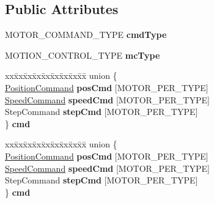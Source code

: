 \subsection*{Public Attributes}
\begin{DoxyCompactItemize}
\item 
\mbox{\label{structRobotCommand_a23247dced08b76adbead322cdd509bfa}} 
M\+O\+T\+O\+R\+\_\+\+C\+O\+M\+M\+A\+N\+D\+\_\+\+T\+Y\+PE {\bfseries cmd\+Type}
\item 
\mbox{\label{structRobotCommand_a1ad710cad025e3ea640bd5887b0ccd0d}} 
M\+O\+T\+I\+O\+N\+\_\+\+C\+O\+N\+T\+R\+O\+L\+\_\+\+T\+Y\+PE {\bfseries mc\+Type}
\item 
\mbox{\label{structRobotCommand_a758436589c753439e4d26b8c6c3c7a34}} 
\begin{tabbing}
xx\=xx\=xx\=xx\=xx\=xx\=xx\=xx\=xx\=\kill
union \{\\
\>\hyperlink{structPositionCommand}{PositionCommand} {\bfseries posCmd} \mbox{[}MOTOR\_PER\_TYPE\mbox{]}\\
\>\hyperlink{structSpeedCommand}{SpeedCommand} {\bfseries speedCmd} \mbox{[}MOTOR\_PER\_TYPE\mbox{]}\\
\>StepCommand {\bfseries stepCmd} \mbox{[}MOTOR\_PER\_TYPE\mbox{]}\\
\} {\bfseries cmd}\\

\end{tabbing}\item 
\mbox{\label{structRobotCommand_a08e1984855ab069a906463f37097ee6e}} 
\begin{tabbing}
xx\=xx\=xx\=xx\=xx\=xx\=xx\=xx\=xx\=\kill
union \{\\
\>\hyperlink{structPositionCommand}{PositionCommand} {\bfseries posCmd} \mbox{[}MOTOR\_PER\_TYPE\mbox{]}\\
\>\hyperlink{structSpeedCommand}{SpeedCommand} {\bfseries speedCmd} \mbox{[}MOTOR\_PER\_TYPE\mbox{]}\\
\>StepCommand {\bfseries stepCmd} \mbox{[}MOTOR\_PER\_TYPE\mbox{]}\\
\} {\bfseries cmd}\\

\end{tabbing}\end{DoxyCompactItemize}



